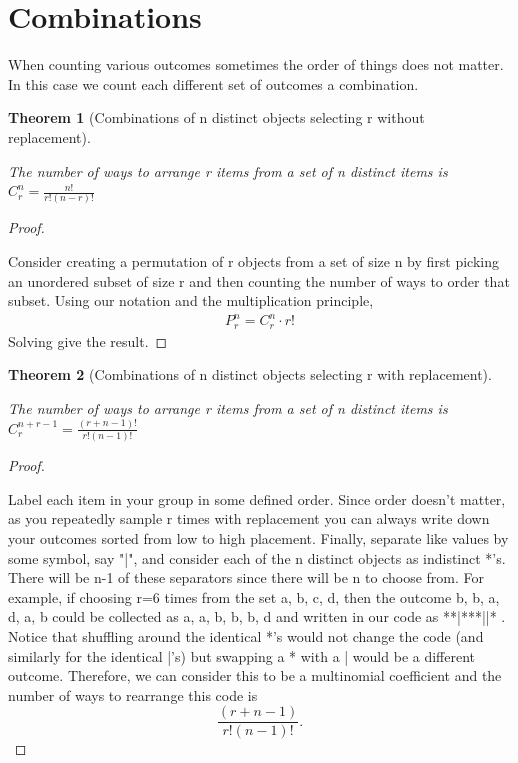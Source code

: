\documentclass[10pt,]{book}
\theoremstyle{plain}
\newtheorem{theorem}{Theorem}[section]
\theoremstyle{definition}
\theoremstyle{definition}
\theoremstyle{definition}
\numberwithin{equation}{section}
\begin{document}
\section[Combinations]{Combinations}\label{section-15}
When counting various outcomes sometimes the order of things does not matter.
In this case we count each different set of outcomes a combination. %
\begin{theorem}[Combinations of n distinct objects selecting r without replacement]\label{theorem-14}

			The number of ways to arrange r items from a set of n distinct items 
			is \( C_r^n = \frac{n!}{r!(n-r)!} \)
\end{theorem}
\begin{proof}\hypertarget{proof-10}{}

			Consider creating a permutation of r objects from a set of size n
			by first picking an unordered subset of size r and then counting 
			the number of ways to order that subset. Using our notation and the
			multiplication principle,
			\begin{gather*}
P_r^n = C_r^n \cdot r!
\end{gather*}
			Solving give the result.
\end{proof}
\begin{theorem}[Combinations of n distinct objects selecting r with replacement]\label{theorem-15}

			The number of ways to arrange r items from a set of n distinct items 
			is \( C_r^{n+r-1} = \frac{(r+n-1)!}{r!(n-1)!} \)
\end{theorem}
\begin{proof}\hypertarget{proof-11}{}

			Label each item in your group in some defined order. Since order doesn't matter, as you repeatedly sample r times with replacement you can always write down your outcomes sorted from low to high placement. Finally, separate like values by some symbol, say "|", and consider each of the n distinct objects as indistinct *'s. There will be n-1 of these separators since there will be n to choose from. For example, if choosing r=6 times from the set {a, b, c, d}, then the outcome b, b, a, d, a, b could be collected as a, a, b, b, b, d and written in our code as **|***||* .  Notice that shuffling around the identical *'s would not change the code (and similarly for the identical |'s) but swapping a * with a | would be a different outcome. Therefore, we can consider this to be a multinomial coefficient and the number of ways to rearrange this code is
			\begin{equation*}\frac{(r + n-1)}{r!(n-1)!}.\end{equation*}
\end{proof}
\end{document}

